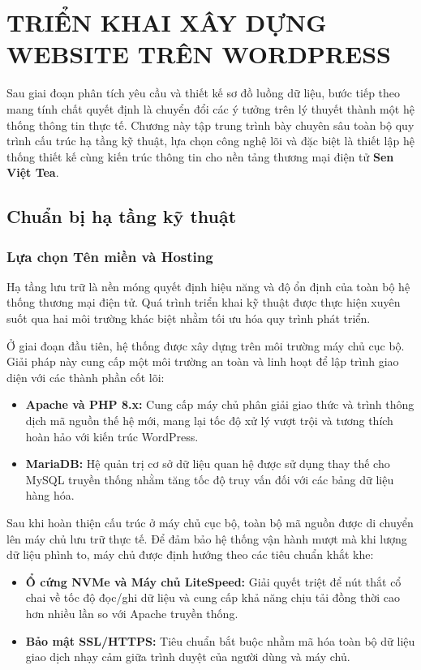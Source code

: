\chapter{TRIỂN KHAI XÂY DỰNG WEBSITE TRÊN WORDPRESS}

Sau giai đoạn phân tích yêu cầu và thiết kế sơ đồ luồng dữ liệu, bước tiếp theo mang tính chất quyết định là chuyển đổi các ý tưởng trên lý thuyết thành một hệ thống thông tin thực tế. Chương này tập trung trình bày chuyên sâu toàn bộ quy trình cấu trúc hạ tầng kỹ thuật, lựa chọn công nghệ lõi và đặc biệt là thiết lập hệ thống thiết kế cùng kiến trúc thông tin cho nền tảng thương mại điện tử \textbf{Sen Việt Tea}. 

\section{Chuẩn bị hạ tầng kỹ thuật}

\subsection{Lựa chọn Tên miền và Hosting}
Hạ tầng lưu trữ là nền móng quyết định hiệu năng và độ ổn định của toàn bộ hệ thống thương mại điện tử. Quá trình triển khai kỹ thuật được thực hiện xuyên suốt qua hai môi trường khác biệt nhằm tối ưu hóa quy trình phát triển. 

Ở giai đoạn đầu tiên, hệ thống được xây dựng trên môi trường máy chủ cục bộ. Giải pháp này cung cấp một môi trường an toàn và linh hoạt để lập trình giao diện với các thành phần cốt lõi:
\begin{itemize}
	\item \textbf{Apache và PHP 8.x:} Cung cấp máy chủ phân giải giao thức và trình thông dịch mã nguồn thế hệ mới, mang lại tốc độ xử lý vượt trội và tương thích hoàn hảo với kiến trúc WordPress.
	\item \textbf{MariaDB:} Hệ quản trị cơ sở dữ liệu quan hệ được sử dụng thay thế cho MySQL truyền thống nhằm tăng tốc độ truy vấn đối với các bảng dữ liệu hàng hóa.
\end{itemize}

Sau khi hoàn thiện cấu trúc ở máy chủ cục bộ, toàn bộ mã nguồn được di chuyển lên máy chủ lưu trữ thực tế. Để đảm bảo hệ thống vận hành mượt mà khi lượng dữ liệu phình to, máy chủ được định hướng theo các tiêu chuẩn khắt khe:
\begin{itemize}
	\item \textbf{Ổ cứng NVMe và Máy chủ LiteSpeed:} Giải quyết triệt để nút thắt cổ chai về tốc độ đọc/ghi dữ liệu và cung cấp khả năng chịu tải đồng thời cao hơn nhiều lần so với Apache truyền thống.
	\item \textbf{Bảo mật SSL/HTTPS:} Tiêu chuẩn bắt buộc nhằm mã hóa toàn bộ dữ liệu giao dịch nhạy cảm giữa trình duyệt của người dùng và máy chủ.
\end{itemize}

